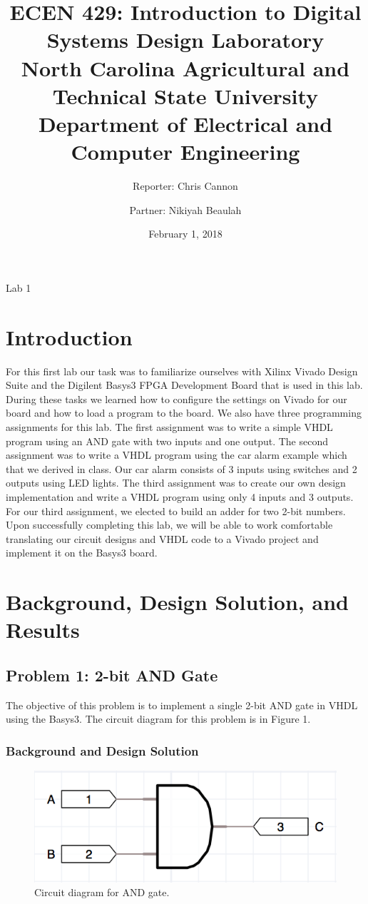 \documentclass[11pt]{article}
\title {ECEN 429: Introduction to Digital Systems Design Laboratory \\ North Carolina Agricultural and Technical State University \\ Department of Electrical and Computer Engineering} %
\author{Reporter: Chris Cannon \\ \and Partner: Nikiyah Beaulah} %
\date{February 1, 2018}
\begin{document}
\maketitle %

\begin{center}
Lab	1
\end{center}

\pagebreak

\section{Introduction}
For this first lab our task was to familiarize ourselves with Xilinx Vivado Design Suite and the Digilent Basys3 FPGA Development Board that is used in this lab. During these tasks we learned how to configure the settings on Vivado for our board and how to load a program to the board. We also have three programming assignments for this lab. The first assignment was to write a simple VHDL program using an AND gate with two inputs and one output. The second assignment was to write a VHDL program using the car alarm example which that we derived in class. Our car alarm consists of 3 inputs using switches and 2 outputs using LED lights.  The third assignment was to create our own design implementation and write a VHDL program using only 4 inputs and 3 outputs. For our third assignment, we elected to build an adder for two 2-bit numbers. Upon successfully completing this lab, we will be able to work comfortable translating our circuit designs and VHDL code to a Vivado project and implement it on the Basys3 board.

\section{Background, Design Solution, and Results}
\subsection{Problem 1: 2-bit AND Gate}
The objective of this problem is to implement a single 2-bit AND gate in VHDL using the Basys3. The circuit diagram for this problem is in Figure 1.

\subsubsection{Background and Design Solution}

\begin{figure}[h]
	\includegraphics[width=\textwidth]{report_images/img2}
	\caption{\label{fig:figure-name}Circuit diagram for AND gate.}
\end{figure}
\end{document}
